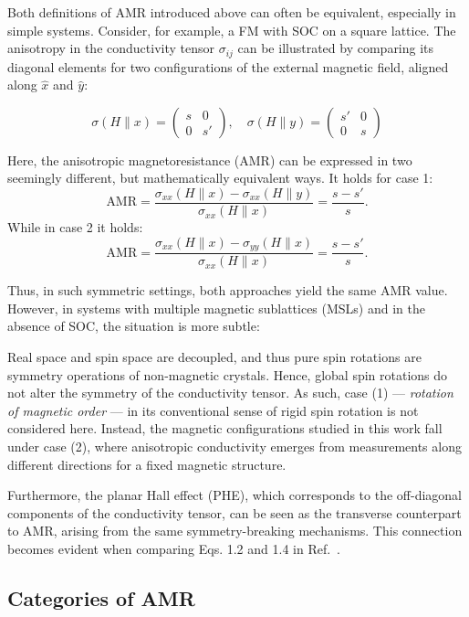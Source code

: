 \documentclass[prb,showpacs,amsmath,amssymb,superscriptaddress,twocolumn,floatfix]{revtex4-1}
\begin{document}
{\color{blue} 
Both definitions of AMR introduced above can often be equivalent, especially in simple systems. Consider, for example, a FM with SOC on a square lattice. The anisotropy in the conductivity tensor $\sigma_{ij}$ can be illustrated by comparing its diagonal elements for two configurations of the external magnetic field, aligned along $\hat{x}$ and $\hat{y}$:

\begin{equation}
	\sigma(H \parallel x) =
	\begin{pmatrix}
		s & 0 \\
		0 & s'
	\end{pmatrix},
	\quad
	\sigma(H \parallel y) =
	\begin{pmatrix}
		s' & 0 \\
		0 & s
	\end{pmatrix}
\end{equation}

Here, the anisotropic magnetoresistance (AMR) can be expressed in two seemingly different, but mathematically equivalent ways. It holds for case 1:
\[
\text{AMR} = \frac{\sigma_{xx}(H \parallel x) - \sigma_{xx}(H \parallel y)}{\sigma_{xx}(H \parallel x)} = \frac{s - s'}{s}.
\]
While in case 2 it holds:
\[
\text{AMR} = \frac{\sigma_{xx}(H \parallel x) - \sigma_{yy}(H \parallel x)}{\sigma_{xx}(H \parallel x)} = \frac{s - s'}{s}.
\]

Thus, in such symmetric settings, both approaches yield the same AMR value. However, in systems with multiple magnetic sublattices (MSLs) and in the absence of SOC, the situation is more subtle:} Real space and spin space are decoupled, and thus pure spin rotations are symmetry operations of non-magnetic crystals. Hence, global spin rotations do not alter the symmetry of the conductivity tensor. As such, case (1) — \textit{rotation of magnetic order} — in its conventional sense of rigid spin rotation is not considered here. Instead, the magnetic configurations studied in this work fall under case (2), where anisotropic conductivity emerges from measurements along different directions for a fixed magnetic structure.

{\color{blue} Furthermore, the planar Hall effect (PHE), which corresponds to the off-diagonal components of the conductivity tensor, can be seen as the transverse counterpart to AMR, arising from the same symmetry-breaking mechanisms.} This connection becomes evident when comparing Eqs. 1.2 and 1.4 in Ref.~\cite{Ritzinger:2023}.


\subsection{Categories of AMR}
\end{document}
